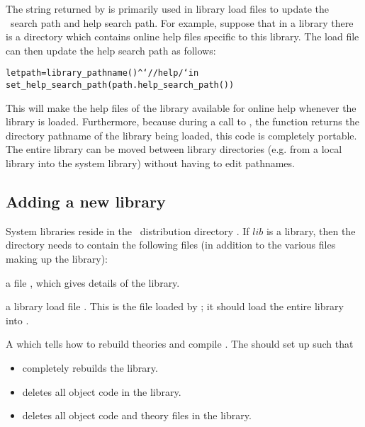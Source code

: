 The string returned by  is primarily used in library load
files to update the \HOL\ search path and help
search path.  For example, suppose that in a library  there is a
directory  which contains online help files specific to this library.
The load file  can then update the help search path as follows:

\begin{hol}\begin{alltt}
   let path = library_pathname() ^ `//help/` in
       set_help_search_path (path . help_search_path())
\end{alltt}\end{hol}

\noindent This will make the help files of the library  available for
online help whenever the library is loaded.  Furthermore, because during a call
to , the function  returns the
directory pathname of the library being loaded, this code is completely
portable.  The entire library  can be moved between library directories
(e.g. from a local library into the system library) without having to edit
pathnames.

\subsection{Adding a new library}

System libraries reside in the \HOL\ distribution directory .
If $lib$ is a library, then the directory
 needs to contain the following files (in addition to the
various files making up the library):

\begin{myenumerate}
\item a file , which gives details of the library.
\item a library load file
. This is the file loaded by ;
it should load the entire library into \HOL.
\item A  which tells how to rebuild theories and 
compile \ML.  The  should set up such that 
\begin{itemize}
\item {} completely rebuilds the library.
\item {} deletes all object code in the library.
\item {} deletes all object code and
theory files in the library.
\end{itemize}
\end{myenumerate}

